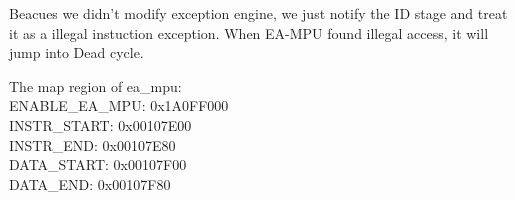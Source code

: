 \documentclass[a4paper]{article}
\begin{document}
Beacues we didn't modify exception engine, we just notify the ID stage and treat it as a illegal instuction exception. When EA-MPU found illegal access, it will jump into Dead cycle.  

The map region of ea\_mpu:			\\
ENABLE\_EA\_MPU: 	0x1A0FF000		\\
INSTR\_START:		0x00107E00		\\
INSTR\_END:			0x00107E80		\\
DATA\_START:		0x00107F00		\\
DATA\_END:			0x00107F80		\\
\end{document}
